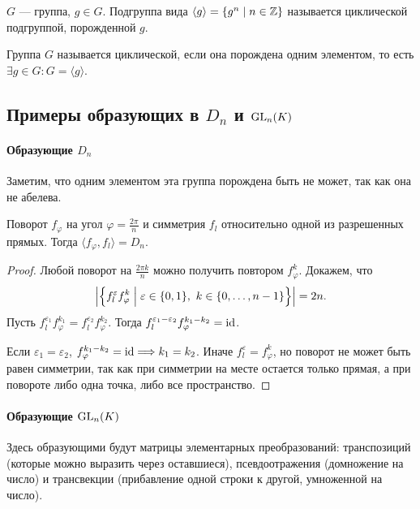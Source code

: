 \begin{defn}
    $ G$ --- группа, $ g \in  G$. Подгруппа вида $ \langle g \rangle = \{g^{n}\mid n \in  \mathbb{Z}\}$ называется {\sf циклической подгруппой, порожденной $ g$}.  
\end{defn}
\begin{defn}
    Группа $ G$ называется \textsf{циклической}, если она порождена одним элементом, то есть $ \exists g \in  G\colon G = \langle g \rangle$.
\end{defn}
\subsection{Примеры образующих в $ D_n$ и  $ {\mathop{\text{\rm GL}}}_n(K)$}
\paragraph{Образующие $ D_n$}
Заметим, что одним элементом эта группа порождена быть не может, так как она не абелева. 
\begin{st}
    Поворот $ f_{\varphi } $ на угол $ \varphi = \frac{2\pi}{n}$ и симметрия $ f_l$ относительно одной из разрешенных прямых. Тогда  $ \langle f_{\varphi }, f_l \rangle = D_n$.
\end{st}
\begin{proof}
    Любой поворот на $ \frac{2\pi k}{n}$ можно получить повтором $ f_{\varphi }^{k}$. Докажем, что 
    \[
	\left| \Bigl\{ f_l^{\varepsilon } f_{\varphi }^{k}\Bigm| \varepsilon  \in \{0, 1\}, ~ k \in \{0, \ldots , n-1\} \Bigr\} \right| = 2n.
    \]
    Пусть  $ f_l^{\varepsilon _1}f_{\varphi }^{k_1} = f_l^{\varepsilon _2}f_{\varphi }^{k_2}$. Тогда $ f_l^{\varepsilon _1 - \varepsilon _2}f_{\varphi }^{k_1-k_2} = {\mathop{\text{\rm id}}}$.
    
    Если $ \varepsilon _1 = \varepsilon _2$, $ f_{\varphi }^{k_1-k_2} = {\mathop{\text{\rm id}}} \Longrightarrow  k_1=k_2$. Иначе $ f_l^{\varepsilon } = f_{\varphi }^{k}$, но поворот не может быть равен симметрии, так как при симметрии на месте остается только прямая, а при повороте либо одна точка, либо все пространство.
\end{proof}
\paragraph{Образующие $ {\mathop{\text{\rm GL}}}_n(K)$}
Здесь образующими будут матрицы элементарных преобразований: транспозиций (которые можно выразить через оставшиеся), псевдоотражения (домножение на число) и трансвекции (прибавление одной строки к другой, умноженной на число).
% 
